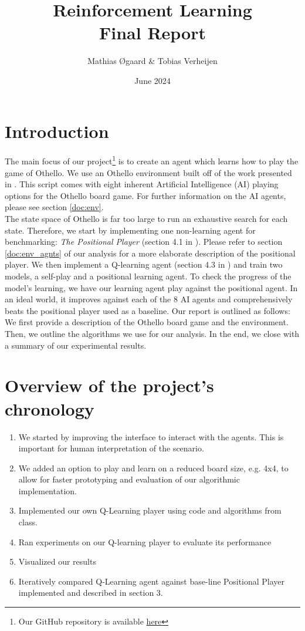 \documentclass{article}
\title{Reinforcement Learning\\ \large{Final Report}}
\author{Mathias Øgaard \& Tobias Verheijen}
\date{June 2024}
\begin{document}
\maketitle

\tableofcontents

\section{Introduction}
The main focus of our project\footnote{Our GitHub repository is available \href{https://github.com/Ma10as00/othello_agent}{here}} is to create an agent which learns how to play the game of Othello. We use an Othello environment built off of the work presented in \cite{codes}. This script comes with eight inherent Artificial Intelligence (AI) playing options for the Othello board game. For further information on the AI agents, please see section \ref{doc:env}.\\
The state space of Othello is far too large to run an exhaustive search for each state. Therefore, we start by implementing one non-learning agent for benchmarking: \textit{The Positional Player} (section 4.1 in \cite{vanEck2008}). Please refer to section \ref{doc:env_agnts} of our analysis for a more elaborate description of the positional player. We then implement a Q-learning agent (section 4.3 in \cite{vanEck2008}) and train two models, a self-play and a positional learning agent.
To check the progress of the model's learning, we have our learning agent play against the positional agent. In an ideal world, it improves against each of the 8 AI agents and comprehensively beats the positional player used as a baseline. Our report is outlined as follows: We first provide a description of the Othello board game and the environment.
Then, we outline the algorithms we use for our analysis. In the end, we close with a summary of our experimental results.

\section{Overview of the project's chronology}

\begin{enumerate}
    \item We started by improving the interface to interact with the agents. This is important for human interpretation of the scenario.
    \item We added an option to play and learn on a reduced board size, e.g. 4x4, to allow for faster prototyping and evaluation of our algorithmic implementation.
    \item Implemented our own Q-Learning player using code and algorithms from class.
    \item Ran experiments on our Q-learning player to evaluate its performance
    \item Visualized our results
    \item Iteratively compared Q-Learning agent against base-line Positional Player implemented and described in section 3.
\end{enumerate}
\end{document}
